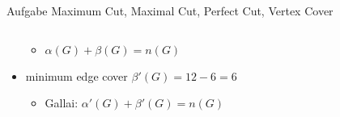 \begin{frame}[allowframebreaks]{Aufgabe \thesection}{Maximum Cut, Maximal Cut, Perfect Cut, Vertex Cover}
\begin{solution}
\begin{columns}
\begin{column}{0.5\textwidth}
\begin{itemize}
          \begin{itemize}
            \item $\alpha(G) + \beta(G) = n(G)$
          \end{itemize}
          \item minimum edge cover $\beta'(G) = 12 - 6 = 6$
          \begin{itemize}
            \item \alert{Gallai:} $\alpha'(G) + \beta'(G) = n(G)$
          \end{itemize}
        \end{itemize}
      \end{column}
      \begin{column}{0.5\textwidth}
      \end{column}
    \end{columns}
  \end{solution}
  \begin{solutionnoinc}
  \end{solutionnoinc}
  \begin{solution}
  \end{solution}
\end{frame}
